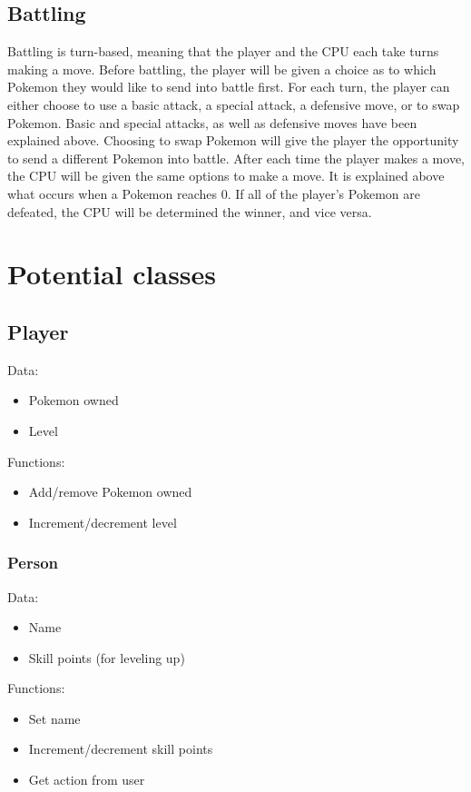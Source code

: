 \documentclass{article}
\begin{document}
  \subsection{Battling}
  Battling is turn-based, meaning that the player and the CPU each take turns making a move. Before battling, the player will be given a choice as to which Pokemon they would like to send into battle first. For each turn, the player can either choose to use a basic attack, a special attack, a defensive move, or to swap Pokemon. Basic and special attacks, as well as defensive moves have been explained above. Choosing to swap Pokemon will give the player the opportunity to send a different Pokemon into battle. After each time the player makes a move, the CPU will be given the same options to make a move. It is explained above what occurs when a Pokemon reaches 0. If all of the player's Pokemon are defeated, the CPU will be determined the winner, and vice versa.
  
  \pagebreak

  \section{Potential classes}
  
  \subsection{Player}
  Data: 
  \begin{itemize}
    \item Pokemon owned
    \item Level 
  \end{itemize}
  Functions:
  \begin{itemize}
    \item Add/remove Pokemon owned
    \item Increment/decrement level
  \end{itemize}
  
  \subsubsection{Person}
  Data:
  \begin{itemize}
    \item Name
    \item Skill points (for leveling up)
  \end{itemize}
  Functions:
  \begin{itemize}
    \item Set name
    \item Increment/decrement skill points
    \item Get action from user
  \end{itemize}
  
\end{document}
